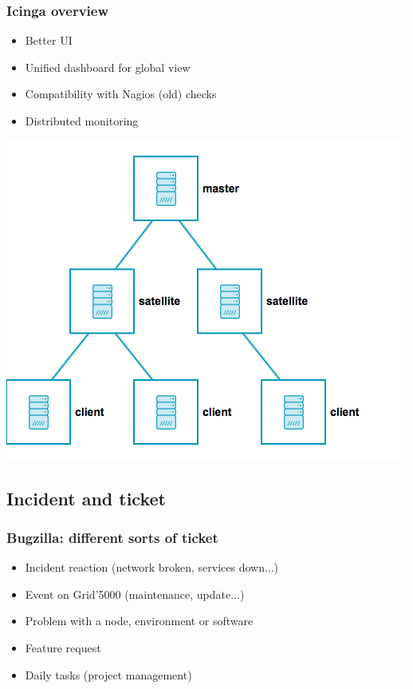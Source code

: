 \documentclass[11pt,compress,final]{beamer}
\begin{document}
\begin{frame}
\frametitle{Icinga overview}
\begin{itemize}
\item Better UI
\item Unified dashboard for global view
\item Compatibility with Nagios (old) checks
\item Distributed monitoring
\end{itemize}
\begin{center}
\includegraphics[scale=0.3]{figures/icinga2_distributed_roles}
\end{center}
\end{frame}

\subsection{Incident and ticket}
\begin{frame}
\frametitle{Bugzilla: different sorts of ticket}
\begin{itemize}
\item Incident reaction (network broken, services down...)
\item Event on Grid'5000 (maintenance, update...)
\item Problem with a node, environment or software
\item Feature request
\item Daily tasks (project management)
\end{itemize}
\end{frame}
\end{document}
